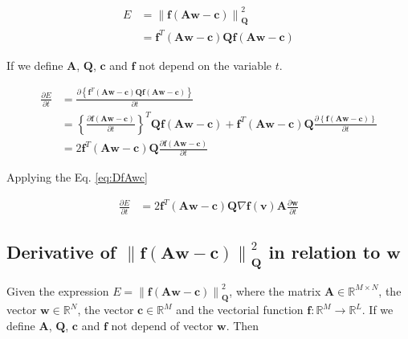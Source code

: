 \begin{align}
E&=\left\|\mathbf{f}\left(\mathbf{A}\mathbf{w}-\mathbf{c}\right)\right\|_{\mathbf{Q}}^2\\
~&=\mathbf{f}^{T}\left(\mathbf{A}\mathbf{w}-\mathbf{c}\right)\mathbf{Q}\mathbf{f}\left(\mathbf{A}\mathbf{w}-\mathbf{c}\right)
\end{align}

If we define $\mathbf{A}$, $\mathbf{Q}$, $\mathbf{c}$ and $\mathbf{f}$ not depend on the variable $t$.

\begin{align}
\frac{\partial E}{\partial t}
&=\frac{\partial\left\{ \mathbf{f}^{T}\left(\mathbf{A}\mathbf{w}-\mathbf{c}\right)\mathbf{Q}\mathbf{f}\left(\mathbf{A}\mathbf{w}-\mathbf{c}\right)\right\}}{\partial t} \\
~
&=
\left\{\frac{\partial \mathbf{f}\left(\mathbf{A}\mathbf{w}-\mathbf{c}\right)}{\partial t} \right\}^{T}
\mathbf{Q}\mathbf{f}\left(\mathbf{A}\mathbf{w}-\mathbf{c}\right)
+
\mathbf{f}^{T}\left(\mathbf{A}\mathbf{w}-\mathbf{c}\right)\mathbf{Q}
\frac{\partial\left\{ \mathbf{f}\left(\mathbf{A}\mathbf{w}-\mathbf{c}\right)\right\}}{\partial t} \\
~
&=
2
\mathbf{f}^{T}\left(\mathbf{A}\mathbf{w}-\mathbf{c}\right)\mathbf{Q}
\frac{\partial \mathbf{f}\left(\mathbf{A}\mathbf{w}-\mathbf{c}\right)}{\partial t} 
\end{align}

Applying the Eq. \ref{eq:DfAwc}

\begin{align}
\label{eq:dEdt}
\frac{\partial E}{\partial t}
&=
2
\mathbf{f}^{T}\left(\mathbf{A}\mathbf{w}-\mathbf{c}\right)\mathbf{Q}
\nabla \mathbf{f}(\mathbf{v})
\mathbf{A}\frac{\partial \mathbf{w}}{\partial t}
\end{align}

\subsection{Derivative of $\left\|\mathbf{f}\left(\mathbf{A}\mathbf{w}-\mathbf{c}\right)\right\|_{\mathbf{Q}}^2$
in relation to $\mathbf{w}$}

Given the expression $E=\left\|\mathbf{f}\left(\mathbf{A}\mathbf{w}-\mathbf{c}\right)\right\|_{\mathbf{Q}}^2$,
where
the matrix $\mathbf{A} \in \mathbb{R}^{M\times N}$,
the vector $\mathbf{w} \in \mathbb{R}^{N}$,
the vector $\mathbf{c} \in \mathbb{R}^{M}$ and 
the vectorial function $\mathbf{f}:\mathbb{R}^{M} \to \mathbb{R}^{L}$.
If we define $\mathbf{A}$, $\mathbf{Q}$, $\mathbf{c}$ and $\mathbf{f}$ not depend of vector $\mathbf{w}$. 
Then 

